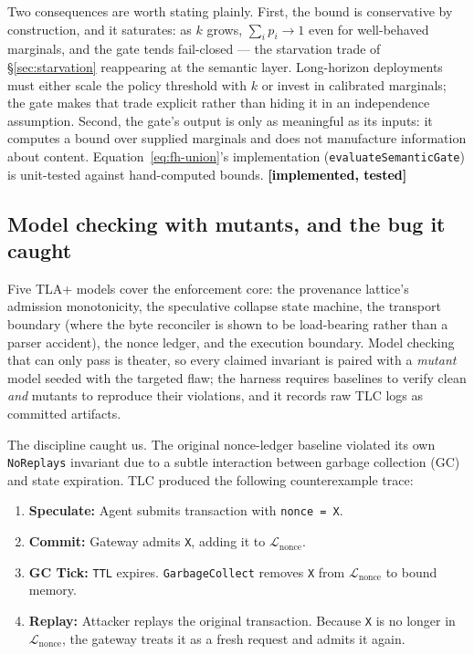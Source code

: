 \documentclass[10pt,twocolumn,letterpaper]{article}
\newcommand{\statusimpl}[0]{\textcolor{black}{\textbf{[implemented, tested]}}}
\begin{document}
Two consequences are worth stating plainly. First, the bound is
conservative by construction, and it saturates: as $k$ grows,
$\sum_i p_i \to 1$ even for well-behaved marginals, and the gate tends
fail-closed --- the starvation trade of \S\ref{sec:starvation} reappearing at
the semantic layer. Long-horizon deployments must either scale the policy
threshold with $k$ or invest in calibrated marginals; the gate makes that
trade explicit rather than hiding it in an independence assumption. Second,
the gate's output is only as meaningful as its inputs: it computes a bound
over supplied marginals and does not manufacture information about content.
Equation~\eqref{eq:fh-union}'s implementation (\texttt{evaluateSemanticGate})
is unit-tested against hand-computed bounds. \statusimpl{}

\subsection{Model checking with mutants, and the bug it caught}
\label{sec:tla}

Five TLA+ models cover the enforcement core: the provenance lattice's
admission monotonicity, the speculative collapse state machine, the transport
boundary (where the byte reconciler is shown to be load-bearing rather than a
parser accident), the nonce ledger, and the execution boundary. Model
checking that can only pass is theater, so every claimed invariant is paired
with a \emph{mutant} model seeded with the targeted flaw; the harness
requires baselines to verify clean \emph{and} mutants to reproduce their
violations, and it records raw TLC logs as committed artifacts.

The discipline caught us. The original nonce-ledger baseline violated its own \texttt{NoReplays} invariant due to a subtle interaction between garbage collection (GC) and state expiration. TLC produced the following counterexample trace:

\begin{enumerate}
    \item \textbf{Speculate:} Agent submits transaction with \texttt{nonce = X}.
    \item \textbf{Commit:} Gateway admits \texttt{X}, adding it to $\mathcal{L}_{\mathrm{nonce}}$.
    \item \textbf{GC Tick:} \texttt{TTL} expires. \texttt{GarbageCollect} removes \texttt{X} from $\mathcal{L}_{\mathrm{nonce}}$ to bound memory.
    \item \textbf{Replay:} Attacker replays the original transaction. Because \texttt{X} is no longer in $\mathcal{L}_{\mathrm{nonce}}$, the gateway treats it as a fresh request and admits it again.
\end{enumerate}
\end{document}
